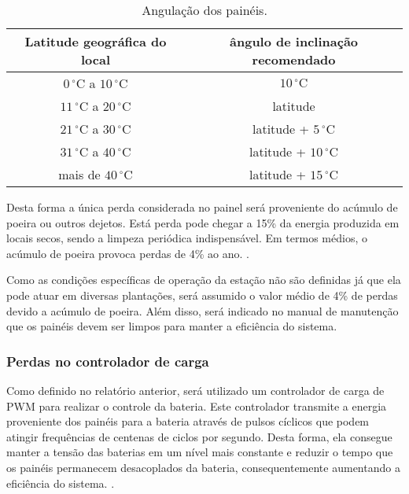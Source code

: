 \begin{table} [H]
\centering
\caption{Angulação dos painéis. \cite{Villalva}}
\begin{tabular}{|c|c|}
\hline
\textbf{Latitude geográfica do local} & \textbf{ângulo de inclinação recomendado}\\
\hline
$0\,^{\circ}\mathrm{C}$ a $10\,^{\circ}\mathrm{C}$& $10\,^{\circ}\mathrm{C}$ \\
\hline
$11\,^{\circ}\mathrm{C}$ a $20\,^{\circ}\mathrm{C}$&  latitude\\
\hline
$21\,^{\circ}\mathrm{C}$ a $30\,^{\circ}\mathrm{C}$& latitude + $5\,^{\circ}\mathrm{C}$\\
\hline
$31\,^{\circ}\mathrm{C}$ a $40\,^{\circ}\mathrm{C}$ &  latitude + $10\,^{\circ}\mathrm{C}$\\
\hline
mais de $40\,^{\circ}\mathrm{C}$ &  latitude + $15\,^{\circ}\mathrm{C}$ \\
\hline
\end{tabular}
\label{ene_pc2_02_tab}
\end{table}	
 
	Desta forma a única perda considerada no painel será proveniente do acúmulo de poeira ou outros dejetos. Está perda pode chegar a 15\% da energia produzida em locais secos, sendo a limpeza periódica indispensável. Em termos médios, o acúmulo de poeira provoca perdas de 4\% ao ano. \cite{zorrilla}. 
	
	Como as condições específicas de operação da estação não são definidas já que ela pode atuar em diversas plantações, será assumido o valor médio de 4\% de perdas devido a acúmulo de poeira. Além disso, será indicado no manual de manutenção que os painéis devem ser limpos para manter a eficiência do sistema.

\subsubsection{Perdas no controlador de carga} 

	Como definido no relatório anterior, será utilizado um controlador de carga de PWM para realizar o controle da bateria. Este controlador transmite a energia proveniente dos painéis para a bateria através de pulsos cíclicos que podem atingir frequências de centenas de ciclos por segundo. Desta forma, ela consegue manter a tensão das baterias em um nível mais constante e reduzir o tempo que os painéis permanecem desacoplados da bateria, consequentemente aumentando a eficiência do sistema. \cite{SAAD}.
	
